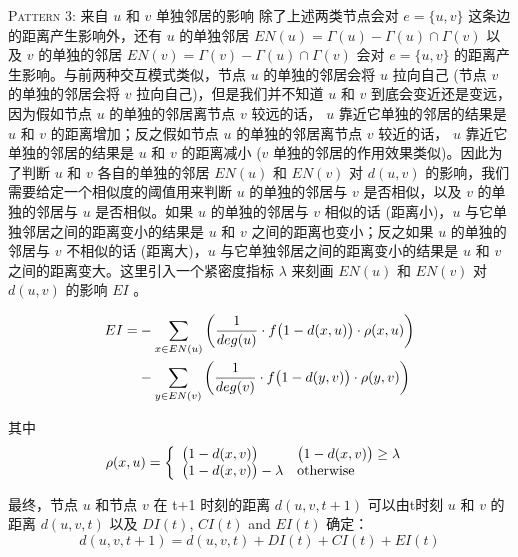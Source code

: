 \textsc{Pattern 3: 来自 $u$ 和 $v$ 单独邻居的影响} 除了上述两类节点会对 $e = \{u,v\}$ 这条边的距离产生影响外，还有 $u$ 的单独邻居 $EN(u) =\Gamma(u) - \Gamma(u) \cap \Gamma(v)$ 以及 $v$ 的单独的邻居 $EN(v) =\Gamma(v) - \Gamma(u) \cap \Gamma(v)$ 会对 $e = \{u,v\}$ 的距离产生影响。与前两种交互模式类似，节点 $u$ 的单独的邻居会将 $u$ 拉向自己 (节点 $v$ 的单独的邻居会将 $v$ 拉向自己)，但是我们并不知道 $u$ 和 $v$ 到底会变近还是变远，因为假如节点 $u$ 的单独的邻居离节点 $v$ 较远的话， $u$ 靠近它单独的邻居的结果是 $u$ 和 $v$ 的距离增加；反之假如节点 $u$ 的单独的邻居离节点 $v$ 较近的话， $u$ 靠近它单独的邻居的结果是 $u$ 和 $v$ 的距离减小 ($v$ 单独的邻居的作用效果类似)。因此为了判断 $u$ 和 $v$ 各自的单独的邻居 $EN(u)$ 和 $EN(v)$ 对 $d(u,v)$ 的影响，我们需要给定一个相似度的阈值用来判断 $u$ 的单独的邻居与 $v$ 是否相似，以及 $v$ 的单独的邻居与 $u$ 是否相似。如果 $u$ 的单独的邻居与 $v$ 相似的话 (距离小)，$u$ 与它单独邻居之间的距离变小的结果是 $u$ 和 $v$ 之间的距离也变小；反之如果 $u$ 的单独的邻居与 $v$ 不相似的话 (距离大)，$u$ 与它单独邻居之间的距离变小的结果是 $u$ 和 $v$ 之间的距离变大。这里引入一个紧密度指标 $\lambda$ 来刻画 $EN(u)$ 和 $EN(v)$ 对 $d(u,v)$ 的影响 $EI$ 。

\begin{equation}
\label{eq:pattern3}
\begin{split}
EI = & -\sum_{x \in EN(u)} \bigg{(}\frac{1}{deg(u)}\cdot f\big{(}1-d(x,u)\big{)}\cdot \rho(x,u) \bigg{)} \\
& -\sum_{y \in EN(v)} \bigg{(}\frac{1}{deg(v)}\cdot f\big{(}1-d(y,v)\big{)}\cdot \rho(y,v) \bigg{)}
\end{split}
\end{equation}

其中
\begin{equation}
\label{eq:sign}
\rho(x,u) = \left\{ \begin{array}{ll}
\big{(}1-d(x,v)\big{)} & \textrm{$\big{(}1-d(x,v)\big{)}  \geq \lambda$ }\\
\big{(}1-d(x,v)\big{)} - \lambda  & \textrm{otherwise}
\end{array} \right.
\end{equation}

\vspace{3mm}
最终，节点 $u$ 和节点 $v$ 在 t+1 时刻的距离 $d(u,v,t+1)$ 可以由t时刻 $u$ 和 $v$ 的距离 $d(u,v,t)$ 以及 $DI(t)$, $CI(t)$ and $EI(t)$ 确定：
\begin{equation}
\label{eq:dynamics}
d(u,v,t+1) = d(u,v,t) + DI(t) + CI(t) + EI(t)
\end{equation}

